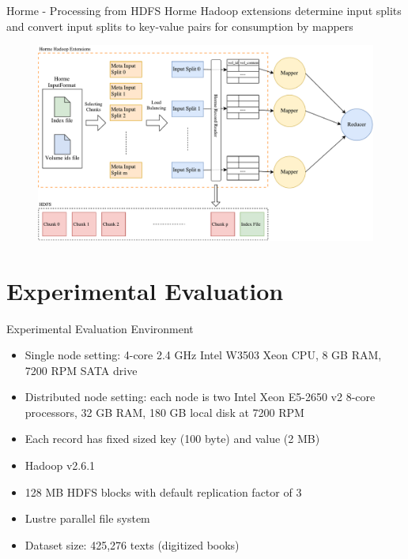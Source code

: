 \documentclass[newPxFont]{beamer}
\begin{document}
\begin{frame}[c]{Horme - Processing from HDFS}
  Horme Hadoop extensions determine input splits and convert input splits to key-value pairs for consumption by mappers
  \begin{figure}[t]
  \includegraphics[scale=0.3]{horme-hdfs}
  \centering
\end{figure}
\end{frame}

\section{Experimental Evaluation}

\begin{frame}[c]{Experimental Evaluation Environment}

\begin{itemize}
  \item Single node setting: 4-core 2.4 GHz Intel W3503 Xeon CPU, 8 GB RAM, 7200 RPM SATA drive 
  \item Distributed node setting: each node is two Intel Xeon E5-2650 v2 8-core processors, 32 GB RAM, 180 GB local disk at 7200 RPM 
  \item Each record has fixed sized key (100 byte) and value (2 MB)
  \item Hadoop v2.6.1
  \item 128 MB HDFS blocks with default replication factor of 3
  \item Lustre parallel file system
  \item Dataset size: 425,276 texts (digitized books)
\end{itemize}
\end{frame}
\end{document}
